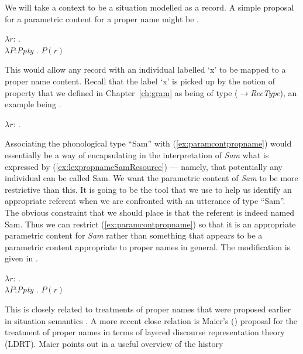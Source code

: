 We will take a context to be a situation
modelled as a record.  A simple proposal for a parametric content for
a proper name might be \nexteg{}.
\begin{ex} 
$\lambda r$: . \\
\hspace*{1em}$\lambda P$:\textit{Ppty} . $P(r)$
\label{ex:paramcontpropname} 
\end{ex} 
This would allow any record with an individual labelled `x' to be
mapped to a proper name content.  Recall that the label `x' is picked
up by the notion of property that we defined in Chapter~\ref{ch:gram}
as being of type
($\rightarrow$\textit{RecType}),
an example being \nexteg{}. 
\begin{ex} 
$\lambda r$: .  
\end{ex} 
Associating the phonological type ``Sam'' with
(\ref{ex:paramcontpropname}) would essentially be a way of
encapsulating in the interpretation of \textit{Sam} what is expressed
by (\ref{ex:lexpropnameSamResource}) --- namely, that potentially any
individual can be called Sam.  We want the parametric content of
\textit{Sam} to be
more restrictive than this.  It is going to be the tool that we use to
help us identify an appropriate referent when we are confronted with
an utterance of type ``Sam''.  The obvious constraint that we should
place is that the referent is indeed named Sam.  Thus we can restrict
(\ref{ex:paramcontpropname}) so that it is an appropriate parametric
content for \textit{Sam} rather than something that appears to be a
parametric content appropriate to proper names in general.  The
modification is given in \nexteg{}.
\begin{ex} 
$\lambda r$: . \\
\hspace*{5em}$\lambda P$:\textit{Ppty} . $P(r)$ 
\label{ex:parametricSam}
\end{ex} 
This is closely related to treatments of proper
names that were proposed earlier in situation semantics
\citep{GawronPeters1990,Cooper1991,BarwiseCooper1993}.  A more recent
close relation is Maier's (\citeyear{Maier2009}) proposal for the
treatment of proper names in terms of layered discourse representation
theory (LDRT).  Maier points out in a useful overview of the history

